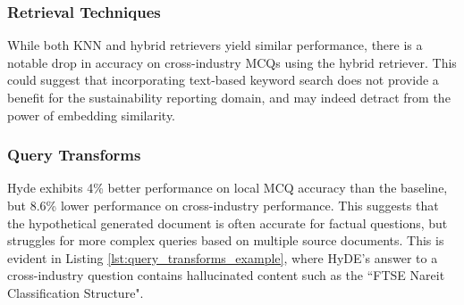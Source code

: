 \subsubsection{Retrieval Techniques}

While both KNN and hybrid retrievers yield similar performance, there is a notable drop in accuracy on cross-industry MCQs using the hybrid retriever. This could suggest that incorporating text-based keyword search does not provide a benefit for the sustainability reporting domain, and may indeed detract from the power of embedding similarity.


\subsubsection{Query Transforms}\label{query_transform_discussion}



Hyde exhibits 4\% better performance on local MCQ accuracy than the baseline, but 8.6\% lower performance on cross-industry performance. This suggests that the hypothetical generated document is often accurate for factual questions, but struggles for more complex queries based on multiple source documents. This is evident in Listing \ref{lst:query_transforms_example}, where HyDE's answer to a cross-industry question contains hallucinated content such as the ``FTSE Nareit Classification Structure". \\


